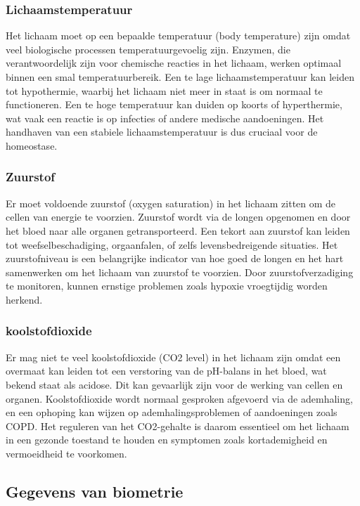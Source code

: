 \subsubsection{Lichaamstemperatuur}
Het lichaam moet op een bepaalde temperatuur (body temperature) zijn omdat veel biologische processen temperatuurgevoelig zijn. Enzymen, die verantwoordelijk zijn voor chemische reacties in het lichaam, werken optimaal binnen een smal temperatuurbereik. Een te lage lichaamstemperatuur kan leiden tot hypothermie, waarbij het lichaam niet meer in staat is om normaal te functioneren. Een te hoge temperatuur kan duiden op koorts of hyperthermie, wat vaak een reactie is op infecties of andere medische aandoeningen. Het handhaven van een stabiele lichaamstemperatuur is dus cruciaal voor de homeostase.

\subsubsection{Zuurstof}
Er moet voldoende zuurstof (oxygen saturation) in het lichaam zitten om de cellen van energie te voorzien. Zuurstof wordt via de longen opgenomen en door het bloed naar alle organen getransporteerd. Een tekort aan zuurstof kan leiden tot weefselbeschadiging, orgaanfalen, of zelfs levensbedreigende situaties. Het zuurstofniveau is een belangrijke indicator van hoe goed de longen en het hart samenwerken om het lichaam van zuurstof te voorzien. Door zuurstofverzadiging te monitoren, kunnen ernstige problemen zoals hypoxie vroegtijdig worden herkend.

\subsubsection{koolstofdioxide}
Er mag niet te veel koolstofdioxide (CO2 level) in het lichaam zijn omdat een overmaat kan leiden tot een verstoring van de pH-balans in het bloed, wat bekend staat als acidose. Dit kan gevaarlijk zijn voor de werking van cellen en organen. Koolstofdioxide wordt normaal gesproken afgevoerd via de ademhaling, en een ophoping kan wijzen op ademhalingsproblemen of aandoeningen zoals COPD. Het reguleren van het CO2-gehalte is daarom essentieel om het lichaam in een gezonde toestand te houden en symptomen zoals kortademigheid en vermoeidheid te voorkomen.


\subsection{Gegevens van biometrie}


